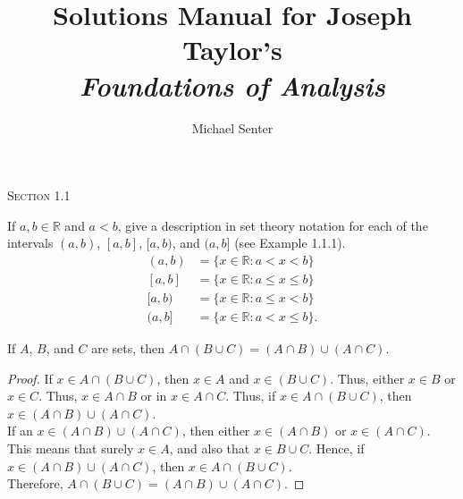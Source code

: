 \documentclass[12pt]{article}
\newenvironment{theorem}[2][Theorem]{\begin{trivlist}
\item[\hskip \labelsep {\bfseries #1}\hskip \labelsep {\bfseries #2.}]}{\end{trivlist}}
\newenvironment{exercise}[2][Exercise]{\begin{trivlist}
\item[\hskip \labelsep {\bfseries #1}\hskip \labelsep {\bfseries #2.}]}{\end{trivlist}}
\begin{document}

\title{Solutions Manual for Joseph Taylor's \\ \emph{Foundations of Analysis}}%
\author{Michael Senter}
\date{}

\maketitle

\begin{center}
\textsc{\Large Section 1.1}
\end{center}

\begin{exercise}{1.1.1} %
If $a, b \in \mathbb{R}$ and $a < b$, give a description in set theory notation for each of the intervals $(a, b)$, $[a, b]$, $[a, b)$, and $(a, b]$ (see Example 1.1.1).
\begin{align*}
	(a,b) &= \{x \in \mathbb{R} : a < x < b\} \\
	[a,b] &= \{x \in \mathbb{R} : a \leq x \leq b\} \\
	[a,b) &= \{x \in \mathbb{R} : a \leq x < b\} \\
	(a,b] &= \{x \in \mathbb{R} : a < x \leq b\}.
\end{align*}
\end{exercise}

\begin{theorem}{1.1.2}
If $A$, $B$, and $C$ are sets, then $A  \cap (B \cup C) = (A \cap B) \cup (A \cap C)$.
\end{theorem}
\begin{proof}
If  $x \in A  \cap (B \cup C)$, then $x \in A$ and $x \in (B \cup C)$. Thus, either $x \in B$ or $x \in C$. Thus, $x \in A \cap B$ or in $x \in A \cap C$. Thus, if $x \in A  \cap (B \cup C)$, then $x \in (A \cap B) \cup (A \cap C)$. \\
If an $x \in (A \cap B) \cup (A \cap C)$, then either $x \in (A \cap B)$ or $x \in (A \cap C)$. This means that surely $x \in A$, and also that $x \in B \cup C$. Hence, if $x \in (A \cap B) \cup (A \cap C)$, then $x \in A  \cap (B \cup C)$.\\ 
Therefore, $A  \cap (B \cup C) = (A \cap B) \cup (A \cap C)$.
\end{proof}
\end{document}
